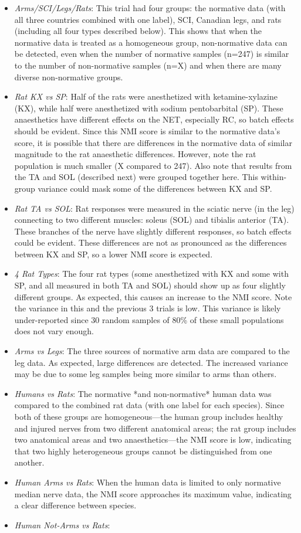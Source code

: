 \documentclass[12pt]{article}
\begin{document}
\begin{itemize}
\item \emph{Arms/SCI/Legs/Rats}: This trial had four groups: the normative data (with all three countries combined with one label), SCI, Canadian legs, and rats (including all four types described below). This shows that when the normative data is treated as a homogeneous group, non-normative data can be detected, even when the number of normative samples (n=247) is similar to the number of non-normative samples (n=X) and when there are many diverse non-normative groups.
\item \emph{Rat KX vs SP}: Half of the rats were anesthetized with ketamine-xylazine (KX), while half were anesthetized with sodium pentobarbital (SP). These anaesthetics have different effects on the NET, especially RC, so batch effects should be evident. Since this NMI score is similar to the normative data's score, it is possible that there are differences in the normative data of similar magnitude to the rat anaesthetic differences. However, note the rat population is much smaller (X compared to 247). Also note that results from the TA and SOL (described next) were grouped together here. This within-group variance could mask some of the differences between KX and SP.
\item \emph{Rat TA vs SOL}: Rat responses were measured in the sciatic nerve (in the leg) connecting to two different muscles: soleus (SOL) and tibialis anterior (TA). These branches of the nerve have slightly different responses, so batch effects could be evident. These differences are not as pronounced as the differences between KX and SP, so a lower NMI score is expected.
\item \emph{4 Rat Types}: The four rat types (some anesthetized with KX and some with SP, and all measured in both TA and SOL) should show up as four slightly different groups. As expected, this causes an increase to the NMI score. Note the variance in this and the previous 3 trials is low. This variance is likely under-reported since 30 random samples of 80\% of these small populations does not vary enough.
\item \emph{Arms vs Legs}: The three sources of normative arm data are compared to the leg data. As expected, large differences are detected. The increased variance may be due to some leg samples being more similar to arms than others.
\item \emph{Humans vs Rats}: The normative *and non-normative* human data was compared to the combined rat data (with one label for each species). Since both of these groups are homogeneous—the human group includes healthy and injured nerves from two different anatomical areas; the rat group includes two anatomical areas and two anaesthetics—the NMI score is low, indicating that two highly heterogeneous groups cannot be distinguished from one another.
\item \emph{Human Arms vs Rats}: When the human data is limited to only normative median nerve data, the NMI score approaches its maximum value, indicating a clear difference between species.
\item \emph{Human Not-Arms vs Rats}:


\end{itemize}
\end{document}

